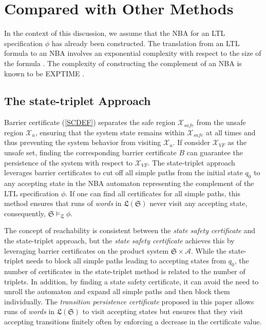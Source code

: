 \section{Compared with Other Methods}
In the context of this discussion, we assume that the NBA for an LTL specification $\phi$ has already been constructed. The translation from an LTL formula to an NBA involves an exponential complexity with respect to the size of the formula \cite{vardi2005automata}. The complexity of constructing the complement of an NBA is known to be EXPTIME \cite{complementnba}.
\subsection{The state-triplet Approach}
Barrier certificate (\ref{SCDEF}) separates the safe region $\mathcal{X}_{safe}$ from the unsafe region $\mathcal{X}_{u}$, ensuring that the system state remains within $\mathcal{X}_{safe}$ at all times and thus preventing the system behavior from visiting $\mathcal{X}_{u}$. If consider $\mathcal{X}_{VF}$ as the unsafe set, finding the corresponding barrier certificate $B$ can guarantee the persistence of the system with respect to $\mathcal{X}_{VF}$. The state-triplet approach leverages barrier certificates to cut off all simple paths from the initial state \(q_0\) to any accepting state in the NBA automaton representing the complement of the LTL specification $\phi$. If one can find all certificates for all simple paths, this method ensures that runs of \emph{words} in $\mathfrak{L}(\mathfrak{S})$ never visit any accepting state, consequently, \(\mathfrak{S} \models_{\mathfrak{L}} \phi\).

The concept of reachability is consistent between the \emph{state safety certificate} and the state-triplet approach, but the \emph{state safety certificate} achieves this by leveraging barrier certificates on the product system $\mathfrak{S} \times \mathcal{A}$. While the state-triplet needs to block all simple paths leading to accepting states from $q_0$, the number of certificates in the state-triplet method is related to the number of triplets. In addition, by finding a state safety certificate, it can avoid the need to unroll the automaton and expand all simple paths and then block them individually. The \emph{transition persistence certificate} proposed in this paper allows runs of \emph{words} in $\mathfrak{L}(\mathfrak{S})$ to visit accepting states but ensures that they visit accepting transitions finitely often by enforcing a decrease in the certificate value.

